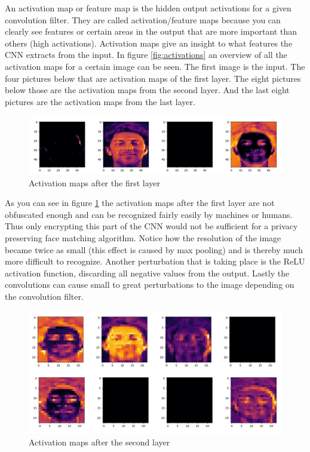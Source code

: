 An activation map or feature map is the hidden output activations for a given convolution filter. They are called activation/feature maps because you can clearly see features or certain areas in the output that are more important than others (high activations). Activation maps give an insight to what features the CNN extracts from the input. In figure \ref{fig:activations} an overview of all the activation maps for a certain image can be seen. The first image is the input. The four pictures below that are activation maps of the first layer. The eight pictures below those are the activation maps from the second layer. And the last eight pictures are the activation maps from the last layer.

\begin{figure}[H]
  \includegraphics[scale=0.4]{fig/activations/7_1.png}
  \centering
  \caption{Activation maps after the first layer}
  \label{fig:activation_1}
\end{figure}

As you can see in figure \ref{fig:activation_1} the activation maps after the first layer are not obfuscated enough and can be recognized fairly easily by machines or humans. Thus only encrypting this part of the CNN would not be sufficient for a privacy preserving face matching algorithm. Notice how the resolution of the image became twice as small (this effect is caused by max pooling) and is thereby much more difficult to recognize. Another perturbation that is taking place is the ReLU activation function, discarding all negative values from the output. Lastly the convolutions can cause small to great perturbations to the image depending on the convolution filter.

\begin{figure}[H]
  \includegraphics[scale=0.4]{fig/activations/7_2.png}
  \centering
  \caption{Activation maps after the second layer}
  \label{fig:activation_2}
\end{figure}


